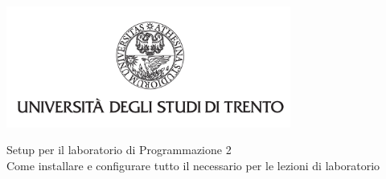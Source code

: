 \begin{titlepage}
	\centering
    \graphicspath{{src/capitoli/01/img/}}
	\includegraphics[width=0.7\textwidth, keepaspectratio]{logo-unitn.png}

	\vspace{1.3cm}
	\Large{Setup per il laboratorio di Programmazione 2\\}
	\vspace{0.4cm}
	\small{Come installare e configurare tutto il necessario per le lezioni di laboratorio}
\end{titlepage}
